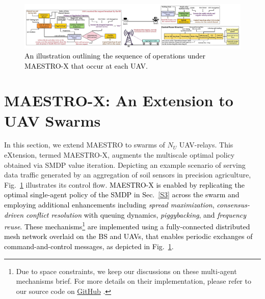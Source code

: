 \documentclass[12pt, draftcls, onecolumn]{IEEEtran}
\theoremstyle{plain}
\theoremstyle{definition}
\theoremstyle{remark}
\newcommand\hlt[1]{\textcolor{black}{#1}}
\begin{document}
\begin{figure} [t]
    \centering
    \includegraphics[width=1.0\linewidth]{figs/Operational_Model_Updated.jpeg}
    \vspace{-8mm}
    \caption{\hlt{An illustration outlining the sequence of operations under MAESTRO-X that occur at each UAV.}}
    \label{F5}
\end{figure}
\vspace{-4mm}

\section{MAESTRO-X: An Extension to UAV Swarms}\label{S5}
In this section, we extend MAESTRO to swarms of $N_{U}$ UAV-relays. This eXtension, termed MAESTRO-X, augments the multiscale optimal policy obtained via SMDP value iteration. Depicting an example scenario of serving data traffic generated by an aggregation of soil sensors in precision agriculture, Fig.~\ref{F5} illustrates its control flow. 
\hlt{MAESTRO-X is enabled by replicating the optimal single-agent policy of the SMDP in Sec.~\ref{S3} across the swarm and employing additional enhancements including \emph{spread maximization}, \emph{consensus-driven conflict resolution} with queuing dynamics, \emph{piggybacking}, and \emph{frequency reuse}. These mechanisms\footnote{Due to space constraints, we keep our discussions on these multi-agent mechanisms brief. For more details on their implementation, please refer to our source code on \href{https://github.com/bharathkeshavamurthy/MAESTRO-X.git}{GitHub} \cite{MAESTRO-X}.} are implemented using a fully-connected distributed mesh network overlaid on the BS and UAVs,
that enables periodic exchanges of command-and-control messages, as depicted in Fig.~\ref{F5}.}
\end{document}
